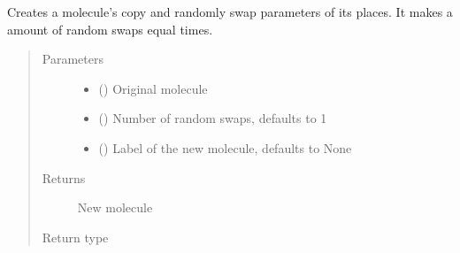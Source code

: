 \documentclass[letterpaper,10pt,english]{sphinxmanual}
\begin{document}
\begin{fulllineitems}
\label{\detokenize{MolOpt.molecular:MolOpt.molecular.molecular.swap_mutate}}
\sphinxAtStartPar
Creates a molecule’s copy and randomly swap parameters of its places. It makes a amount of random swaps equal 
times.
\begin{quote}\begin{description}
\item[{Parameters}] \leavevmode\begin{itemize}
\item {} 
\sphinxAtStartPar
{} ({\hyperref[\detokenize{MolOpt.molecular:MolOpt.molecular.molecular.Molecule}]{}}) \textendash{} Original molecule

\item {} 
\sphinxAtStartPar
{} (\sphinxstyleliteralemphasis{\sphinxupquote{, }}) \textendash{} Number of random swaps, defaults to 1

\item {} 
\sphinxAtStartPar
{} (\sphinxstyleliteralemphasis{\sphinxupquote{, }}) \textendash{} Label of the new molecule, defaults to None

\end{itemize}

\item[{Returns}] \leavevmode
\sphinxAtStartPar
New molecule

\item[{Return type}] \leavevmode
\sphinxAtStartPar
{\hyperref[\detokenize{MolOpt.molecular:MolOpt.molecular.molecular.Molecule}]{}}

\end{description}\end{quote}

\end{fulllineitems}
\end{document}
